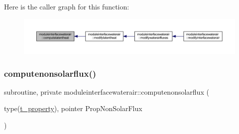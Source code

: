 Here is the caller graph for this function\+:\nopagebreak
\begin{figure}[H]
\begin{center}
\leavevmode
\includegraphics[width=350pt]{namespacemoduleinterfacewaterair_a5442677ffd4780b9f170ffed821b8185_icgraph}
\end{center}
\end{figure}
\mbox{\label{namespacemoduleinterfacewaterair_a440fa94544c221014817ea4b5bea703a}} 
\subsubsection{\texorpdfstring{computenonsolarflux()}{computenonsolarflux()}}
{\footnotesize\ttfamily subroutine, private moduleinterfacewaterair\+::computenonsolarflux (\begin{DoxyParamCaption}\item[{type(\mbox{\hyperlink{structmoduleinterfacewaterair_1_1t__property}{t\+\_\+property}}), pointer}]{Prop\+Non\+Solar\+Flux }\end{DoxyParamCaption})\hspace{0.3cm}{\ttfamily [private]}}

